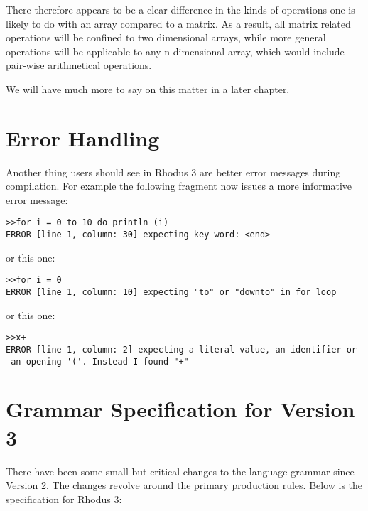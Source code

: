 There therefore appears to be a clear difference in the kinds of operations one is likely to do with an array compared to a matrix. As a result, all matrix related operations will be confined to two dimensional arrays, while more general operations will be applicable to any n-dimensional array, which would include pair-wise arithmetical operations.

We will have much more to say on this matter in a later chapter.

\section{Error Handling}

Another thing users should see in Rhodus 3 are better error messages during compilation. For example the following fragment now issues a more informative error message:

\begin{lstlisting}
>>for i = 0 to 10 do println (i)
ERROR [line 1, column: 30] expecting key word: <end>
\end{lstlisting}

or this one:

\begin{lstlisting}
>>for i = 0
ERROR [line 1, column: 10] expecting "to" or "downto" in for loop
\end{lstlisting}

or this one:

\begin{lstlisting}
>>x+
ERROR [line 1, column: 2] expecting a literal value, an identifier or
 an opening '('. Instead I found "+"
\end{lstlisting}

\section{Grammar Specification for Version 3}

There have been some small but critical changes to the language grammar since Version 2. The changes revolve around the primary production rules. Below is the specification for Rhodus 3:

